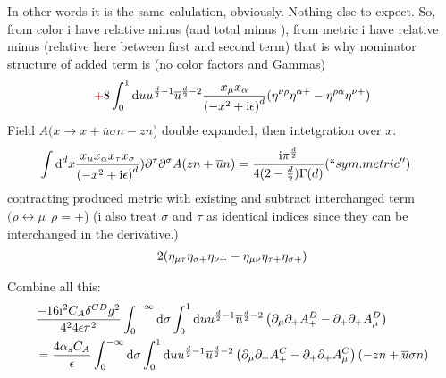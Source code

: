 In other words it is the same calulation, obviously. Nothing else to expect.
So, from color i have relative minus (and total minus ), from metric i have relative minus (relative here between first and second term)
that is why nominator structure of added term is (no color factors and Gammas)
\begin{align}
{\color{red}+}8\int_{0}^{1} \text{d} u u^{\frac{d}{2}-1} \overline u^{\frac{d}{2}-2}\frac{x_\mu x_\alpha}{\left(-x^2 + \text{i} \epsilon\right)^{d}}(\eta^{\nu \rho } \eta^{\alpha + } - \eta^{\rho \alpha}\eta^{\nu +})
\end{align}
Field $A(x\rightarrow x + \overline u \sigma n -zn$) double expanded, then intetgration over $x$.
\begin{align}
	\int \text{d} ^d x\frac{x_\mu x_\alpha x_\tau x_\sigma}{\left(-x^2 + \text{i} \epsilon\right)^{d}}) \partial^\tau \partial^\sigma A(zn+\overline u n)
	&=
	\frac{\text{i} \pi^{\frac{d}{2}}}{4(2-\frac{d}{2})\Gamma(d)} (``sym. metric'')
\end{align}
contracting produced metric with existing and subtract interchanged term $(\rho \leftrightarrow \mu ~~\rho = +$) (i also treat $\sigma$ and $\tau$ as identical indices since they can be interchanged in the derivative.)
\begin{align}
	2(\eta_{\mu \tau}\eta_{\sigma+}\eta_{\nu + } - \eta_{\mu \nu } \eta_{\tau +}\eta_{\sigma+})
\end{align}

Combine all this:
\begin{align}
	&\frac{-16\text{i}^2 C_A \delta^{CD} g^2}{4^24\epsilon \pi^2}\int_{0}^{-\infty} \text{d} \sigma \int_0^1 \text{d} u u^{\frac{d}{2}-1} \overline u^{\frac{d}{2}-2} \left(\partial_\mu \partial_+ A^D_+ - \partial_+\partial_+ A^D_\mu\right)
	\\
	&=
	\frac{4 \alpha_s C_A }{\epsilon}\int_{0}^{-\infty} \text{d} \sigma \int_0^1 \text{d} u u^{\frac{d}{2}-1} \overline u^{\frac{d}{2}-2} \left(\partial_\mu \partial_+ A^C_+ - \partial_+\partial_+ A^C_\mu\right)(-zn+\overline u \sigma n)
\end{align}

